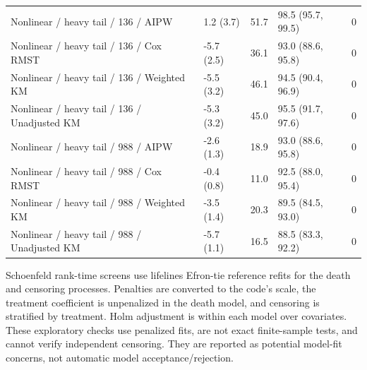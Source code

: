 \documentclass[12pt,letterpaper]{article}
\begin{document}
\begin{longtable}{p{2.0in}p{1.0in}p{0.6in}p{1.7in}p{0.55in}}
Nonlinear / heavy tail / 136 / AIPW & 1.2 (3.7) & 51.7 & 98.5 (95.7, 99.5) & 0 \\
Nonlinear / heavy tail / 136 / Cox RMST & -5.7 (2.5) & 36.1 & 93.0 (88.6, 95.8) & 0 \\
Nonlinear / heavy tail / 136 / Weighted KM & -5.5 (3.2) & 46.1 & 94.5 (90.4, 96.9) & 0 \\
Nonlinear / heavy tail / 136 / Unadjusted KM & -5.3 (3.2) & 45.0 & 95.5 (91.7, 97.6) & 0 \\
Nonlinear / heavy tail / 988 / AIPW & -2.6 (1.3) & 18.9 & 93.0 (88.6, 95.8) & 0 \\
Nonlinear / heavy tail / 988 / Cox RMST & -0.4 (0.8) & 11.0 & 92.5 (88.0, 95.4) & 0 \\
Nonlinear / heavy tail / 988 / Weighted KM & -3.5 (1.4) & 20.3 & 89.5 (84.5, 93.0) & 0 \\
Nonlinear / heavy tail / 988 / Unadjusted KM & -5.7 (1.1) & 16.5 & 88.5 (83.3, 92.2) & 0 \\
\end{longtable}
Schoenfeld rank-time screens use lifelines Efron-tie reference refits for the death and censoring
processes. Penalties are converted to the code's scale, the treatment coefficient is unpenalized in the
death model, and censoring is stratified by treatment. Holm adjustment is within each model over covariates.
These exploratory checks use penalized fits, are not exact finite-sample tests, and cannot verify independent
censoring. They are reported as potential model-fit concerns, not automatic model acceptance/rejection.
\end{document}
